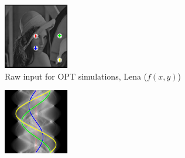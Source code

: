 \begin{figure}
  \centering
  \hfill
  \begin{subfigure}[t]{0.3\textwidth}
    \includegraphics[width=\textwidth]{Chapters/flopt/Figs/PDF/results/no_helix/rawinput_colour}
    \caption{Raw input for OPT simulations, Lena (\(f(x,y)\))}
    \label{fig:raw_input}
  \end{subfigure}\hfill
  \begin{subfigure}[t]{0.3\textwidth}
    \includegraphics[width=\textwidth]{Chapters/flopt/Figs/PDF/results/no_helix/sinugram_stretch}

\end{subfigure}
\end{figure}
